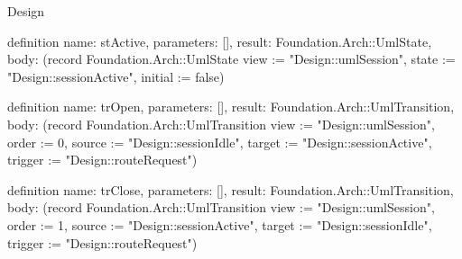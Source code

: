 \begin{lexlean}{Design}
\begin{semanticmodule}
definition{
  name: stActive,
  parameters: [],
  result: Foundation.Arch::UmlState,
  body: (record Foundation.Arch::UmlState {view := "Design::umlSession", state := "Design::sessionActive", initial := false})
}

definition{
  name: trOpen,
  parameters: [],
  result: Foundation.Arch::UmlTransition,
  body: (record Foundation.Arch::UmlTransition {view := "Design::umlSession", order := 0, source := "Design::sessionIdle", target := "Design::sessionActive", trigger := "Design::routeRequest"})
}

definition{
  name: trClose,
  parameters: [],
  result: Foundation.Arch::UmlTransition,
  body: (record Foundation.Arch::UmlTransition {view := "Design::umlSession", order := 1, source := "Design::sessionActive", target := "Design::sessionIdle", trigger := "Design::routeRequest"})
}

\end{semanticmodule}
\end{lexlean}
